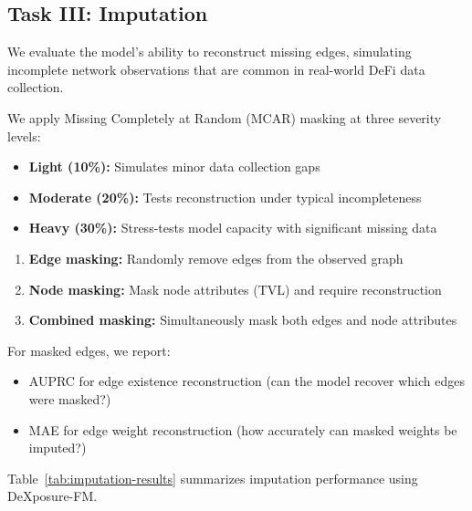 \documentclass[preprint,12pt]{elsarticle}
\renewcommand{\paragraph}[1]{}
\begin{document}
\subsection{Task III: Imputation}
\label{subsec:imputation}

We evaluate the model's ability to reconstruct missing edges, simulating incomplete network observations that are common in real-world DeFi data collection.

\paragraph{Masking protocol.}
We apply Missing Completely at Random (MCAR) masking at three severity levels:
\begin{itemize}
  \item \textbf{Light (10\%):} Simulates minor data collection gaps
  \item \textbf{Moderate (20\%):} Tests reconstruction under typical incompleteness
  \item \textbf{Heavy (30\%):} Stress-tests model capacity with significant missing data
\end{itemize}

\paragraph{Masking types.}
\begin{enumerate}
  \item \textbf{Edge masking:} Randomly remove edges from the observed graph
  \item \textbf{Node masking:} Mask node attributes (TVL) and require reconstruction
  \item \textbf{Combined masking:} Simultaneously mask both edges and node attributes
\end{enumerate}

\paragraph{Metrics.}
For masked edges, we report:
\begin{itemize}
  \item AUPRC for edge existence reconstruction (can the model recover which edges were masked?)
  \item MAE for edge weight reconstruction (how accurately can masked weights be imputed?)
\end{itemize}

\paragraph{Results.}
Table~\ref{tab:imputation-results} summarizes imputation performance using DeXposure-FM.
\end{document}
